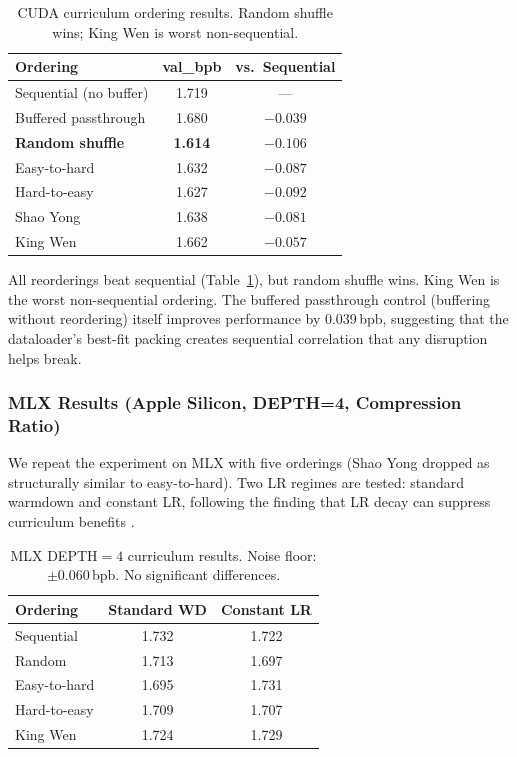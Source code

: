 \documentclass{article}
\begin{document}
\begin{table}[h]
\centering
\begin{tabular}{lcc}
\toprule
\textbf{Ordering} & \textbf{val\_bpb} & \textbf{vs.\ Sequential} \\
\midrule
Sequential (no buffer) & 1.719 & --- \\
Buffered passthrough & 1.680 & $-0.039$ \\
\textbf{Random shuffle} & \textbf{1.614} & $\mathbf{-0.106}$ \\
Easy-to-hard & 1.632 & $-0.087$ \\
Hard-to-easy & 1.627 & $-0.092$ \\
Shao Yong & 1.638 & $-0.081$ \\
King Wen & 1.662 & $-0.057$ \\
\bottomrule
\end{tabular}
\caption{CUDA curriculum ordering results. Random shuffle wins; King Wen is worst non-sequential.}
\label{tab:cuda}
\end{table}

All reorderings beat sequential (Table~\ref{tab:cuda}), but random shuffle wins. King Wen is the worst non-sequential ordering. The buffered passthrough control (buffering without reordering) itself improves performance by 0.039\,bpb, suggesting that the dataloader's best-fit packing creates sequential correlation that any disruption helps break.

\subsubsection{MLX Results (Apple Silicon, DEPTH=4, Compression Ratio)}

We repeat the experiment on MLX with five orderings (Shao Yong dropped as structurally similar to easy-to-hard). Two LR regimes are tested: standard warmdown and constant LR, following the finding that LR decay can suppress curriculum benefits \cite{agarwal2025lrdecay}.

\begin{table}[h]
\centering
\begin{tabular}{lcc}
\toprule
\textbf{Ordering} & \textbf{Standard WD} & \textbf{Constant LR} \\
\midrule
Sequential & 1.732 & 1.722 \\
Random & 1.713 & 1.697 \\
Easy-to-hard & 1.695 & 1.731 \\
Hard-to-easy & 1.709 & 1.707 \\
King Wen & 1.724 & 1.729 \\
\bottomrule
\end{tabular}
\caption{MLX DEPTH${}=4$ curriculum results. Noise floor: $\pm 0.060$\,bpb. No significant differences.}
\label{tab:mlx4}
\end{table}
\end{document}
